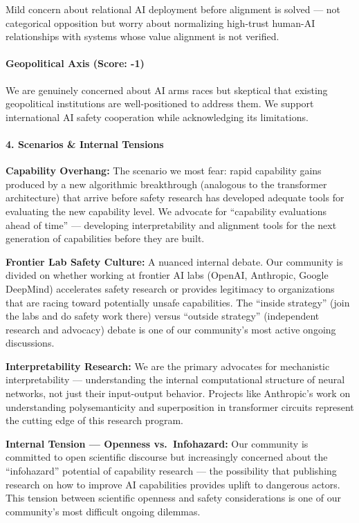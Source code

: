 Mild concern about relational AI deployment before alignment is solved
--- not categorical opposition but worry about normalizing high-trust
human-AI relationships with systems whose value alignment is not
verified.

\paragraph{Geopolitical Axis (Score:
-1)}\label{geopolitical-axis-score--1}

We are genuinely concerned about AI arms races but skeptical that
existing geopolitical institutions are well-positioned to address them.
We support international AI safety cooperation while acknowledging its
limitations.

\paragraph{4. Scenarios \& Internal
Tensions}\label{scenarios-internal-tensions-3}

\textbf{Capability Overhang:} The scenario we most fear: rapid
capability gains produced by a new algorithmic breakthrough (analogous
to the transformer architecture) that arrive before safety research has
developed adequate tools for evaluating the new capability level. We
advocate for ``capability evaluations ahead of time'' --- developing
interpretability and alignment tools for the next generation of
capabilities before they are built.

\textbf{Frontier Lab Safety Culture:} A nuanced internal debate. Our
community is divided on whether working at frontier AI labs (OpenAI,
Anthropic, Google DeepMind) accelerates safety research or provides
legitimacy to organizations that are racing toward potentially unsafe
capabilities. The ``inside strategy'' (join the labs and do safety work
there) versus ``outside strategy'' (independent research and advocacy)
debate is one of our community's most active ongoing discussions.

\textbf{Interpretability Research:} We are the primary advocates for
mechanistic interpretability --- understanding the internal
computational structure of neural networks, not just their input-output
behavior. Projects like Anthropic's work on understanding
polysemanticity and superposition in transformer circuits represent the
cutting edge of this research program.

\textbf{Internal Tension --- Openness vs.~Infohazard:} Our community is
committed to open scientific discourse but increasingly concerned about
the ``infohazard'' potential of capability research --- the possibility
that publishing research on how to improve AI capabilities provides
uplift to dangerous actors. This tension between scientific openness and
safety considerations is one of our community's most difficult ongoing
dilemmas.

